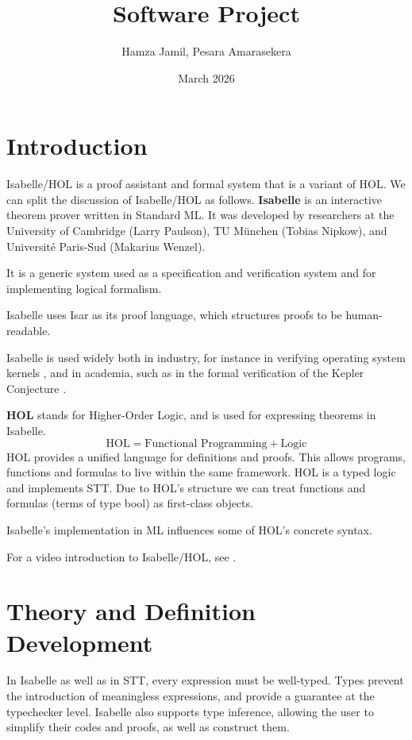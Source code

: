 \documentclass{article}
\title{Software Project}
\author{Hamza Jamil, Pesara Amarasekera}
\date{March 2026}
\begin{document}
\maketitle

\section{Introduction}

Isabelle/HOL is a proof assistant and formal system that is a variant of HOL.
We can split the discussion of Isabelle/HOL as follows.
\textbf{Isabelle} is an interactive theorem prover written in Standard ML. It
was developed by researchers at the University of Cambridge (Larry Paulson),
TU M\"unchen (Tobias Nipkow), and Universit\'e Paris-Sud (Makarius Wenzel).

It is a generic system used as a specification and verification system and for implementing
logical formalism.

Isabelle uses Isar as its proof language, which structures proofs to be human-readable.

Isabelle is used widely both in industry, for instance in verifying operating system kernels \cite{klein2009sel4}, and in academia, such as in the formal verification of the Kepler Conjecture \cite{hales2017flyspeck}.

\textbf{HOL} stands for Higher-Order Logic, and is used for expressing theorems in Isabelle.
\[ \text{HOL} = \text{Functional Programming} + \text{Logic}\]
HOL provides a unified language for definitions and proofs. This allows programs, functions
and formulas to live within the same framework. HOL is a typed logic and implements STT.
Due to HOL's structure we can treat functions and formulas (terms of type bool) as first-class objects.

Isabelle's implementation in ML influences some of HOL's concrete syntax.

For a video introduction to Isabelle/HOL, see \cite{Bhargavtutorial}.


\section{Theory and Definition Development}

In Isabelle as well as in STT, every expression must be well-typed. Types prevent the introduction of meaningless
expressions, and provide a guarantee at the typechecker level. Isabelle also supports type inference, allowing
the user to simplify their codes and proofs, as well as construct them.
\end{document}
